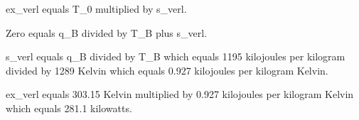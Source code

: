 ex_verl equals T_0 multiplied by s_verl.  

Zero equals q_B divided by T_B plus s_verl.  

s_verl equals q_B divided by T_B which equals 1195 kilojoules per kilogram divided by 1289 Kelvin which equals 0.927 kilojoules per kilogram Kelvin.  

ex_verl equals 303.15 Kelvin multiplied by 0.927 kilojoules per kilogram Kelvin which equals 281.1 kilowatts.